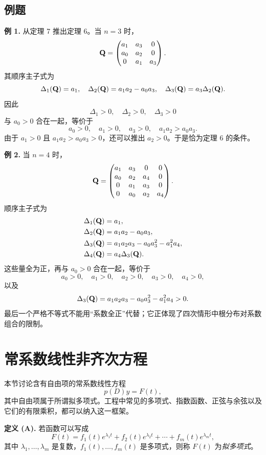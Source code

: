 \subsection*{例题}

\noindent\textbf{例 1.}
从定理 7 推出定理 6。当 \(n=3\) 时，
\[
 \mathbf{Q}=
 \begin{pmatrix}
  a_1&a_3&0\\
  a_0&a_2&0\\
  0&a_1&a_3
 \end{pmatrix}.
\]
其顺序主子式为
\[
 \Delta_1(\mathbf{Q})=a_1,
 \quad
 \Delta_2(\mathbf{Q})=a_1a_2-a_0a_3,
 \quad
 \Delta_3(\mathbf{Q})=a_3\Delta_2(\mathbf{Q}).
\]
因此
\[
 \Delta_1>0,\quad \Delta_2>0,\quad \Delta_3>0
\]
与 \(a_0>0\) 合在一起，等价于
\[
 a_0>0,\quad
 a_1>0,\quad
 a_3>0,\quad
 a_1a_2>a_0a_3.
\]
由于 \(a_1>0\) 且 \(a_1a_2>a_0a_3>0\)，还可以推出 \(a_2>0\)。于是恰为定理 6 的条件。

\noindent\textbf{例 2.}
当 \(n=4\) 时，
\[
 \mathbf{Q}=
 \begin{pmatrix}
  a_1&a_3&0&0\\
  a_0&a_2&a_4&0\\
  0&a_1&a_3&0\\
  0&a_0&a_2&a_4
 \end{pmatrix}.
\]
顺序主子式为
\begin{align*}
 \Delta_1(\mathbf{Q})&=a_1,\\
 \Delta_2(\mathbf{Q})&=a_1a_2-a_0a_3,\\
 \Delta_3(\mathbf{Q})&=a_1a_2a_3-a_0a_3^2-a_1^2a_4,\\
 \Delta_4(\mathbf{Q})&=a_4\Delta_3(\mathbf{Q}).
\end{align*}
这些量全为正，再与 \(a_0>0\) 合在一起，等价于
\[
 a_0>0,\quad a_1>0,\quad a_2>0,\quad a_3>0,\quad a_4>0,
\]
以及
\[
 \Delta_3(\mathbf{Q})=a_1a_2a_3-a_0a_3^2-a_1^2a_4>0.
\]
最后一个严格不等式不能用“系数全正”代替；它正体现了四次情形中根分布对系数组合的限制。

\section{常系数线性非齐次方程}

本节讨论含有自由项的常系数线性方程
\begin{equation}
 p(D)y=F(t),
 \label{eq:ch2-10-nonhomogeneous}
\end{equation}
其中自由项属于所谓拟多项式。工程中常见的多项式、指数函数、正弦与余弦以及它们的有限乘积，都可以纳入这一框架。

\medskip
\noindent\textbf{定义 (A).}
若函数可以写成
\begin{equation}
 F(t)=f_1(t)e^{\lambda_1t}+f_2(t)e^{\lambda_2t}
   +\cdots+f_m(t)e^{\lambda_mt},
 \label{eq:ch2-10-quasipolynomial}
\end{equation}
其中 \(\lambda_1,\ldots,\lambda_m\) 是复数，\(f_1(t),\ldots,f_m(t)\) 是多项式，则称 \(F(t)\) 为\emph{拟多项式}。

